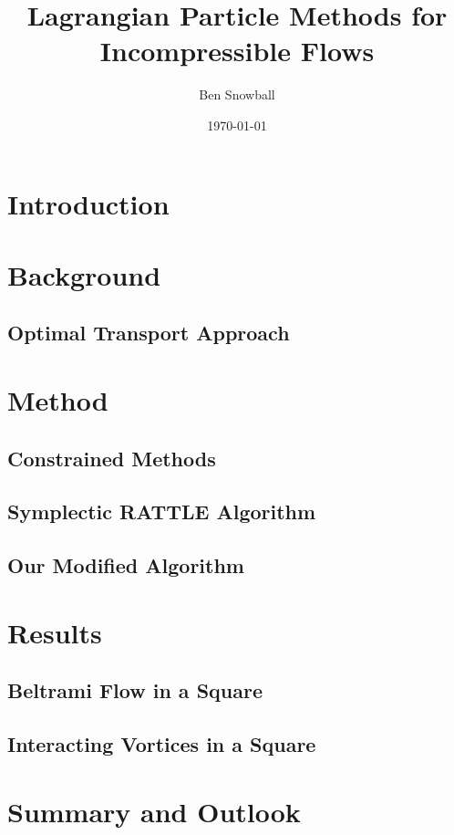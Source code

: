 \documentclass[10pt]{beamer}
\title{Lagrangian Particle Methods for Incompressible Flows}
\author{Ben Snowball}
\date{\today}
\begin{document}
\frame{\titlepage}

\section[Outline]{}
\frame{\tableofcontents}
\section{Introduction}
\section{Background}
\subsection{Optimal Transport Approach}
\section{Method}
\subsection{Constrained Methods}
\subsection{Symplectic RATTLE Algorithm}
\subsection{Our Modified Algorithm}
\section{Results}
\subsection{Beltrami Flow in a Square}
\subsection{Interacting Vortices in a Square}
\section{Summary and Outlook}
\end{document}
